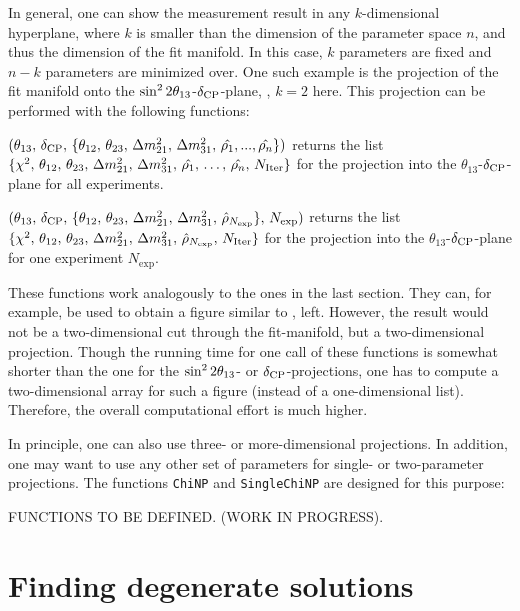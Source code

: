 In general, one can show the measurement result in any $k$-dimensional hyperplane, where $k$ is smaller than the dimension of the parameter space $n$, and thus the dimension of the fit manifold. In this case, $k$ parameters are fixed and $n-k$ parameters are minimized over. One such example is the projection of the fit manifold onto the $\sin^2 2 \theta_{13}$-$\delta_{\mathrm{CP}}$-plane, \ie, $k=2$ here. This projection can be performed with the following functions:
\begin{function}
$(\theta_{13}, \, \delta_{\mathrm{CP}}, \, \{ \theta_{12}, \, \theta_{23},  \, \Delta m_{21}^2 , \, \Delta m_{31}^2, \,   \hat{\rho_1}, ... , \hat{\rho_n} \})$ returns the list  $\{ \chi^2, \, \theta_{12}, \, \theta_{23}, \, \Delta m_{21}^2 , \, \Delta m_{31}^2,  \, \hat{\rho_1}, \, \hdots , \, \hat{\rho_n} , \, N_{\mathrm{Iter}} \}$ for the projection into the $\theta_{13}$-$\delta_{\mathrm{CP}}$-plane for all experiments.
\end{function}
\begin{function}
$( \theta_{13}, \, \delta_{\mathrm{CP}}, \, \{ \theta_{12}, \, \theta_{23}, \, \Delta m_{21}^2 , \, \Delta m_{31}^2, \,   \hat{\rho}_{N_{\mathrm{exp}}} \}, \, N_{\mathrm{exp}})$ returns the list $\{ \chi^2, \, \theta_{12}, \,   \theta_{23},  \, \Delta m_{21}^2 , \, \Delta m_{31}^2, \, \hat{\rho}_{N_{\mathrm{exp}}} ,  \, N_{\mathrm{Iter}} \}$ for the projection into the $\theta_{13}$-$\delta_{\mathrm{CP}}$-plane for one experiment $N_{\mathrm{exp}}$.
\end{function}
These functions work analogously to the ones in the last section. They can, for example, be used to obtain a figure similar to , left. However, the result would not be a two-dimensional cut through the fit-manifold, but a two-dimensional projection. Though the running time for one call of these functions is somewhat shorter than the one for the $\sin^2 2 \theta_{13}$- or $\delta_{\mathrm{CP}}$-projections, one has to compute a two-dimensional array for such a figure (instead of a one-dimensional list). Therefore, the overall computational effort is much higher.

In principle, one can also use three- or more-dimensional projections. In addition, one may want to use any other set of parameters for single- or two-parameter projections. The functions {\tt ChiNP} and {\tt SingleChiNP} are designed for this purpose:

FUNCTIONS TO BE DEFINED. (WORK IN PROGRESS).

\chapter{Finding degenerate solutions}

